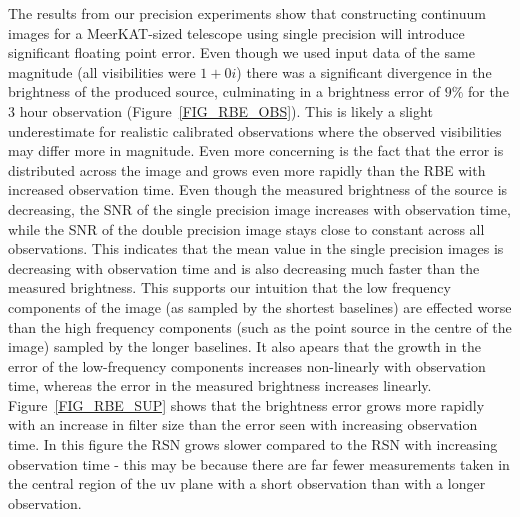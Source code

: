 The results from our precision experiments show that constructing continuum images for a MeerKAT-sized telescope using single precision will introduce significant floating point error. Even though we used input data of the same magnitude (all
visibilities were $1+0i$) there was a significant divergence in the brightness of the produced source, culminating in a brightness error of $9\%$ for the 3 hour observation (Figure~\ref{FIG_RBE_OBS}). This is likely a slight underestimate 
for realistic calibrated observations where the observed visibilities may differ more in magnitude. Even more concerning is the fact that the error is distributed across the image and grows even more rapidly than the RBE with 
increased observation time. Even though the measured brightness of the source is decreasing, the SNR of the single precision image increases with observation time, while the SNR of the double precision image stays close to 
constant across all observations. This indicates that the mean value in the single precision images is decreasing with observation time and is also decreasing much faster than the measured brightness. This supports our 
intuition that the low frequency components of the image (as sampled by the shortest baselines) are effected worse than the high frequency components (such as the point source in the centre of the image) sampled by the longer baselines. It 
also apears that the growth in the error of the low-frequency components increases non-linearly with observation time, whereas the error in the measured brightness increases linearly. Figure~\ref{FIG_RBE_SUP} shows that the brightness error 
grows more rapidly with an increase in filter size than the error seen with increasing observation time. In this figure the RSN grows slower compared to the RSN with increasing observation time - this may be because there are far 
fewer measurements taken in the central region of the uv plane with a short observation than with a longer observation. 

